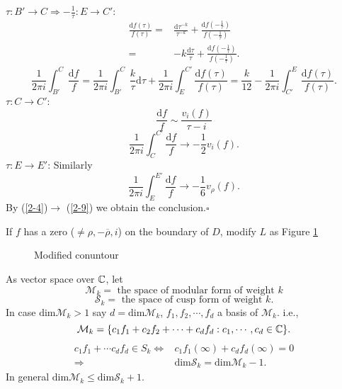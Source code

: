 $\tau:B'\to C\Rightarrow -\frac{1}{\tau}:E\to C'$:
\begin{align*}
  \frac{\mathrm{d}f(\tau)}{f(\tau)}=&\frac{\mathrm{d}\tau^{-k}}{\tau^{-k}}+\frac{\mathrm{d}f(-\frac{1}{\tau})}{f(-\frac{1}{\tau})}\\
  =& -k \frac{\mathrm{d}\tau}{\tau}+ \frac{\mathrm{d}f(-\frac{1}{\tau})}{f(-\frac{1}{\tau})}.
\end{align*}
\begin{equation}
  \frac{1}{2\pi i}\int_{B'}^{C}\frac{\mathrm{d}f}{f}=\frac{1}{2\pi i}\int_{B'}^{C}\frac{k}{\tau}\mathrm{d}\tau+\frac{1}{2\pi i}\int_{E}^{C'} \frac{\mathrm{d}f(\tau)}{f(\tau)}=\frac{k}{12}-\frac{1}{2\pi i}\int_{C'}^{E} \frac{\mathrm{d}f(\tau)}{f(\tau)}.
\end{equation}
$\tau:C\to C'$:
 \[
   \frac{\mathrm{d}f}{f}\sim \frac{v_i(f)}{\tau-i}
\] 
\begin{equation}
  \frac{1}{2\pi i}\int_{C}^{C'}\frac{\mathrm{d}f}{f}\to -\frac{1}{2}v_i(f).
\end{equation}
$\tau:E\to E'$: Similarly 
\begin{equation}\label{2-9}
  \frac{1}{2\pi i}\int_{E}^{E'} \frac{\mathrm{d}f}{f}\to -\frac{1}{6}v_\rho(f).
\end{equation}
By (\ref{2-4})$\to$ (\ref{2-9}) we obtain the conclusion.\hfill$\square$\par
If $f$ has a zero ($\neq \rho,-\overline{\rho},i$) on the boundary of $D$, modify $L$ as Figure \ref{fig:modified}
\begin{figure}[ht]
    \centering
    \caption{Modified conuntour}
    \label{fig:modified}
\end{figure}

As vector space over $\mathbb{C}$, let 
\[
\mathcal{M}_k= \text{ the space of modular form of weight }k
\] 
\[
\mathcal{S}_k=\text{ the space of cusp form of weight }k.
\] 
In case $\mathrm{dim}\mathcal{M}_k>1$ say $d=\mathrm{dim}\mathcal{M}_k$, $f_1,f_2,\cdots,f_d$ a basis of $\mathcal{M}_k$. i.e.,
\[
\mathcal{M}_k=\{c_1f_1+c_2f_2+\cdots+c_df_d:c_1,\cdots,c_d \in \mathbb{C}\}. 
\] 
\begin{align*}
  c_1f_1+\cdots c_df_d\in S_k \Leftrightarrow & c_1f_1(\infty)+c_df_d(\infty)=0\\
  \Rightarrow & \mathrm{dim}\mathcal{S}_k=\mathrm{dim}\mathcal{M}_k-1
.\end{align*}
In general $\mathrm{dim}\mathcal{M}_k\le \mathrm{dim}\mathcal{S}_k+1$.

